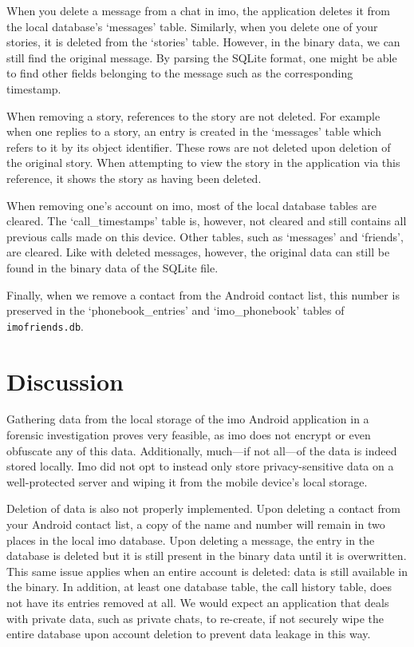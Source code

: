 \documentclass[conference]{IEEEtran}
\begin{document}
When you delete a message from a chat in imo, the application deletes it from
the local database's `messages' table. Similarly, when you delete one of your
stories, it is deleted from the `stories' table. However, in the binary data,
we can still find the original message. By parsing the SQLite format, one might
be able to find other fields belonging to the message such as the corresponding
timestamp.

When removing a story, references to the story are not deleted. For example
when one replies to a story, an entry is created in the `messages' table which
refers to it by its object identifier. These rows are not deleted upon deletion
of the original story. When attempting to view the story in the application via
this reference, it shows the story as having been deleted.

When removing one's account on imo, most of the local database tables are
cleared. The `call\_timestamps' table is, however, not cleared and still
contains all previous calls made on this device. Other tables, such as
`messages' and `friends', are cleared. Like with deleted messages, however, the
original data can still be found in the binary data of the SQLite file.

Finally, when we remove a contact from the Android contact list, this number is
preserved in the `phonebook\_entries' and `imo\_phonebook' tables of
\texttt{imofriends.db}.


\section{Discussion}\label{sec:disc}

Gathering data from the local storage of the imo Android application in a
forensic investigation proves very feasible, as imo does not encrypt or even
obfuscate any of this data. Additionally, much---if not all---of the data is
indeed stored locally. Imo did not opt to instead only store privacy-sensitive
data on a well-protected server and wiping it from the mobile device's local
storage.

Deletion of data is also not properly implemented. Upon deleting a contact from
your Android contact list, a copy of the name and number will remain in two
places in the local imo database. Upon deleting a message, the entry in the
database is deleted but it is still present in the binary data until it is
overwritten. This same issue applies when an entire account is deleted: data is
still available in the binary. In addition, at least one database table, the
call history table, does not have its entries removed at all. We would expect
an application that deals with private data, such as private chats, to
re-create, if not securely wipe the entire database upon account deletion to
prevent data leakage in this way.
\end{document}
